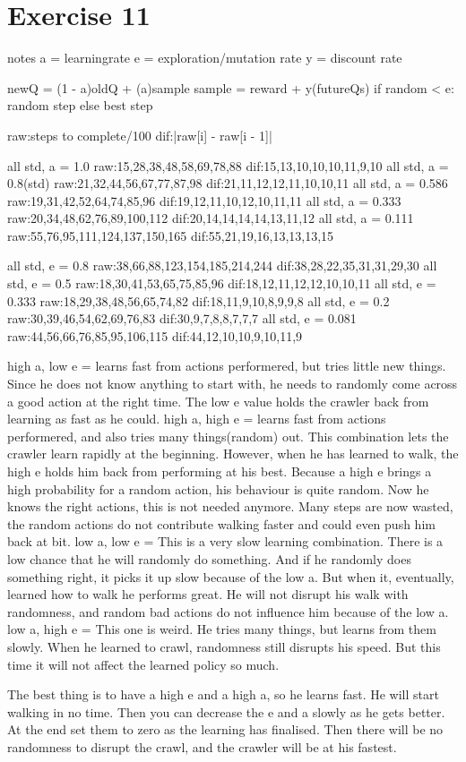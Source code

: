 \section{Exercise 11}
notes
a = learningrate
e = exploration/mutation rate
y = discount rate

newQ = (1 - a)oldQ + (a)sample
sample = reward + y(futureQs)
if random < e: random step
else best step

raw:steps to complete/100
dif:|raw[i] - raw[i - 1]|

all std, a = 1.0
raw:15,28,38,48,58,69,78,88
dif:15,13,10,10,10,11,9,10
all std, a = 0.8(std)
raw:21,32,44,56,67,77,87,98
dif:21,11,12,12,11,10,10,11
all std, a = 0.586
raw:19,31,42,52,64,74,85,96
dif:19,12,11,10,12,10,11,11
all std, a = 0.333
raw:20,34,48,62,76,89,100,112
dif:20,14,14,14,14,13,11,12
all std, a = 0.111
raw:55,76,95,111,124,137,150,165
dif:55,21,19,16,13,13,13,15

all std, e = 0.8
raw:38,66,88,123,154,185,214,244
dif:38,28,22,35,31,31,29,30
all std, e = 0.5
raw:18,30,41,53,65,75,85,96
dif:18,12,11,12,12,10,10,11
all std, e = 0.333
raw:18,29,38,48,56,65,74,82
dif:18,11,9,10,8,9,9,8
all std, e = 0.2
raw:30,39,46,54,62,69,76,83
dif:30,9,7,8,8,7,7,7
all std, e = 0.081
raw:44,56,66,76,85,95,106,115
dif:44,12,10,10,9,10,11,9

high a, low e = learns fast from actions performered, but tries little new things.
Since he does not know anything to start with, he needs to randomly come across a good action at the right time.
The low e value holds the crawler back from learning as fast as he could.
high a, high e = learns fast from actions performered, and also tries many things(random) out.
This combination lets the crawler learn rapidly at the beginning. However, when he has learned to walk, the high e
holds him back from performing at his best. Because a high e brings a high probability for a random action, his
behaviour is quite random. Now he knows the right actions, this is not needed anymore. Many steps are now wasted, the random
actions do not contribute walking faster and could even push him back at bit.
low a, low e = This is a very slow learning combination. There is a low chance that he will randomly do something.
And if he randomly does something right, it picks it up slow because of the low a. But when it, eventually, learned how to walk
he performs great. He will not disrupt his walk with randomness, and random bad actions do not influence him because of
the low a.
low a, high e = This one is weird. He tries many things, but learns from them slowly. When he learned to crawl, randomness
still disrupts his speed. But this time it will not affect the learned policy so much.

The best thing is to have a high e and a high a, so he learns fast. He will start walking in no time. Then you can decrease
the e and a slowly as he gets better. At the end set them to zero as the learning has finalised. Then there will be no
randomness to disrupt the crawl, and the crawler will be at his fastest.